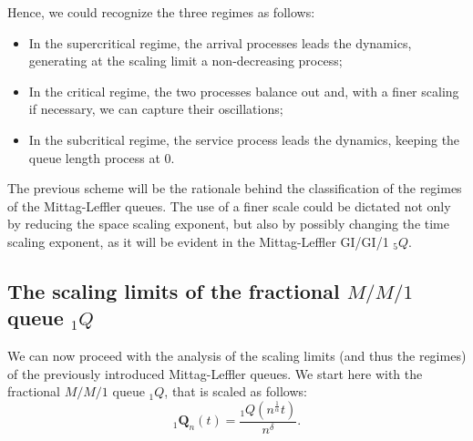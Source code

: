 \documentclass[]{amsart}
\numberwithin{equation}{section}
\theoremstyle{remark}
\newtheorem{rmk}[thm]{Remark}
\theoremstyle{definition}
\begin{document}
Hence, we could recognize the three regimes as follows:
\begin{itemize}
	\item In the supercritical regime, the arrival processes leads the dynamics, generating at the scaling limit a non-decreasing process;
	\item In the critical regime, the two processes balance out and, with a finer scaling if necessary, we can capture their oscillations;
	\item In the subcritical regime, the service process leads the dynamics, keeping the queue length process at $0$. 
\end{itemize}
The previous scheme will be the rationale behind the classification of the regimes of the Mittag-Leffler queues. 
{The use of a finer scale could be dictated not only by reducing the space scaling exponent, but also by possibly changing the time scaling exponent, as it will be evident in the Mittag-Leffler GI/GI/1 ${}_5Q$.}


\subsection{The scaling limits of the fractional $M/M/1$ queue ${}_1Q$}\label{sec:MM11}
We can now proceed with the analysis of the scaling limits (and thus the regimes) of the previously introduced Mittag-Leffler queues. We start here with the fractional $M/M/1$ queue ${}_1Q$, that is scaled as follows:
\begin{equation}\label{eq:rescalingmod1}
	{}_1\mathbf{Q}_n(t)=\frac{{}_1Q(n^{\frac{1}{\alpha}}t)}{n^\delta}.
\end{equation}
 
\end{document}
